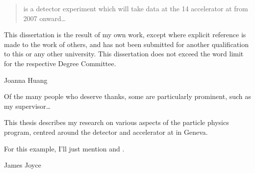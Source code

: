 
\begin{abstract}%
  \LHCb is a \bphysics detector experiment which will take data at
  the \unit{14}{\TeV} \LHC accelerator at \CERN from 2007 onward\dots
\end{abstract}


\begin{declaration}
  This dissertation is the result of my own work, except where explicit
  reference is made to the work of others, and has not been submitted
  for another qualification to this or any other university. This
  dissertation does not exceed the word limit for the respective Degree
  Committee.
  \vspace*{1cm}
  \begin{flushright}
    Joanna Huang
  \end{flushright}
\end{declaration}


\begin{acknowledgements}
  Of the many people who deserve thanks, some are particularly prominent,
  such as my supervisor\dots
\end{acknowledgements}


\begin{preface}
  This thesis describes my research on various aspects of the \LHCb
  particle physics program, centred around the \LHCb detector and \LHC
  accelerator at \CERN in Geneva.

  \noindent
  For this example, I'll just mention 
  and .
\end{preface}

\tableofcontents

%
  {James Joyce}
\thispagestyle{empty}
